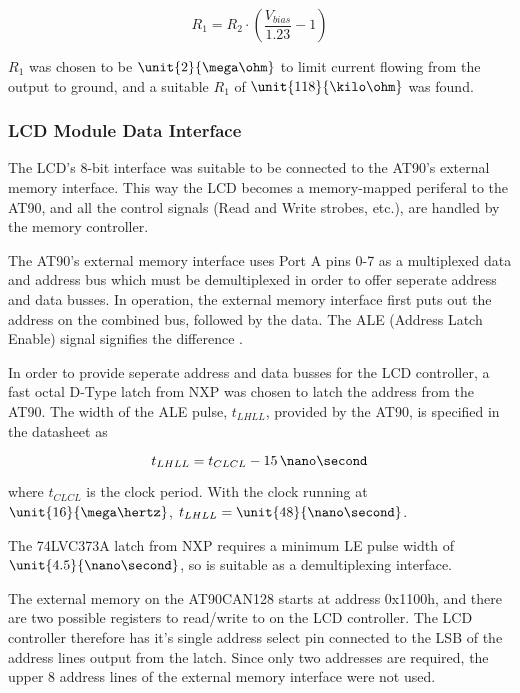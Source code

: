 \begin{equation}
R_{1}=R_{2}\cdot\left(\frac{V_{bias}}{1.23}-1\right)
\end{equation}

 $R_{1}$ was chosen to be $\unit{2}{\mega\ohm}$ to limit current flowing from the output to ground, and a suitable $R_{1}$ of $\unit{118}{\kilo\ohm}$ was found.


\subsubsection{LCD Module Data Interface}

The LCD's 8-bit interface was suitable to be connected to the AT90's external memory interface. This way the LCD becomes a memory-mapped periferal to the AT90, and all the control signals (Read and Write strobes, etc.), are handled by the memory controller.

The AT90's external memory interface uses Port A pins 0-7 as a multiplexed data and address bus which must be demultiplexed in order to offer seperate address and data busses. In operation, the external memory interface first puts out the address on the combined bus, followed by the data. The ALE (Address Latch Enable) signal signifies the difference \cite{AT90CAN}.

In order to provide seperate address and data busses for the LCD controller, a fast octal D-Type latch from NXP was chosen to latch the address from the AT90. The width of the ALE pulse, $t_{LHLL}$, provided by the AT90, is specified in the datasheet as

\begin{equation}
t_{LHLL}=t_{CLCL}-15\, \nano\second
\end{equation}

 where $t_{CLCL}$ is the clock period. With the clock running at $\unit{16}{\mega\hertz}$, $t_{LHLL}=\unit{48}{\nano\second}$.

The 74LVC373A latch from NXP requires a minimum LE pulse width of $\unit{4.5}{\nano\second}$, so is suitable as a demultiplexing interface.

The external memory on the AT90CAN128 starts at address 0x1100h, and there are two possible registers to read/write to on the LCD controller. The LCD controller therefore has it's single address select pin connected to the LSB of the address lines output from the latch. Since only two addresses are required, the upper 8 address lines of the external memory interface were not used.

